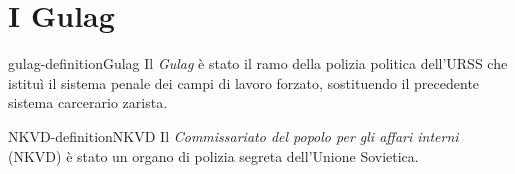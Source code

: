 \documentclass[preview]{standalone}
\begin{document}
\genpage

\section{I Gulag}

\begin{snippetdefinition}{gulag-definition}{Gulag}
    Il \textit{Gulag} è stato il ramo della polizia politica dell'URSS
    che istituì il sistema penale dei campi di lavoro forzato,
    sostituendo il precedente sistema carcerario zarista.
\end{snippetdefinition}


\begin{snippetdefinition}{NKVD-definition}{NKVD}
    Il \textit{Commissariato del popolo per gli affari interni} (NKVD)
    è stato un organo di polizia segreta dell'Unione Sovietica.
\end{snippetdefinition}
\end{document}
